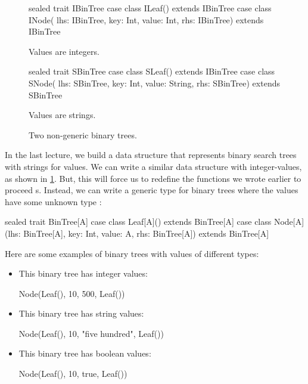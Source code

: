 \documentclass{book}
\begin{document}
\begin{figure}

\begin{minipage}{0.45\textwidth}
\begin{scalacode}
sealed trait IBinTree
case class ILeaf() extends IBinTree
case class INode(
  lhs: IBinTree,
  key: Int,
  value: Int,
  rhs: IBinTree)
  extends IBinTree
\end{scalacode}
\caption{Values are integers.}
\end{minipage}
\quad\vrule\quad
\begin{minipage}{0.45\textwidth}
\begin{scalacode}
sealed trait SBinTree
case class SLeaf() extends IBinTree
case class SNode(
  lhs: SBinTree,
  key: Int,
  value: String,
  rhs: SBinTree)
  extends SBinTree
\end{scalacode}
\caption{Values are strings.}
\end{minipage}
\caption{Two non-generic binary trees.}
\label{monobintrees}
\end{figure}

In the last lecture, we build a data structure that represents binary
search trees with strings for values. We can write a similar data structure
with integer-values, as shown in \cref{monobintrees}. But, this will force
us to redefine the functions we wrote earlier to proceed s.
Instead, we can write a generic type for binary trees where the values have
some unknown type :

%
\begin{scalacode}
sealed trait BinTree[A]
case class Leaf[A]() extends BinTree[A]
case class Node[A](lhs: BinTree[A], key: Int, value: A, rhs: BinTree[A]) extends BinTree[A]
\end{scalacode}

Here are some examples of binary trees with values of different types:

\begin{itemize}

\item This binary tree has integer values:
\begin{scalacode}
Node(Leaf(), 10, 500, Leaf())
\end{scalacode}

\item This binary tree has string values:
\begin{scalacode}
Node(Leaf(), 10, "five hundred", Leaf())
\end{scalacode}

\item This binary tree has boolean values:
\begin{scalacode}
Node(Leaf(), 10, true, Leaf())
\end{scalacode}

\end{itemize}
\end{document}
